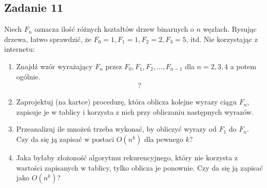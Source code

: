\documentclass{article}
\begin{document}
\subsection*{Zadanie 11}
Niech $F_n$ oznacza ilość różnych kształtów drzew binarnych o $n$ węzłach. Rysując drzewa,
łatwo sprawdzić, że $F_0 = 1, F_1 = 1, F_2 = 2, F_3 = 5$, itd. Nie korzystając z internetu:
\begin{enumerate}[label=(\alph*)]
    \item Znajdź wzór wyrażający $F_n$ przez $F_0, F_1, F_2, \dots, F_{n-1}$ dla $n = 2, 3, 4$ a potem ogólnie.
          \begin{gather*}
              ?
          \end{gather*}
    \item Zaprojektuj (na kartce) procedurę, która oblicza kolejne wyrazy ciągu $F_n$, zapisuje
          je w tablicy i korzysta z nich przy obliczaniu następnych wyrazów.
    \item Przeanalizuj ile mnożeń trzeba wykonać, by obliczyć wyrazy od $F_1$ do $F_n$. Czy da
          się ją zapisać w postaci $O(n^k)$ dla pewnego $k$?
    \item Jaka byłaby złożoność algorytmu rekurencyjnego, który nie korzysta z wartości
          zapisanych w tablicy, tylko oblicza je ponownie. Czy da się ją zapisać jako $O(n^k)$?
\end{enumerate}
\end{document}

